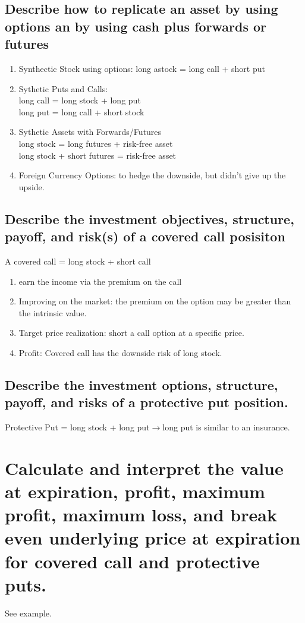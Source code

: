 \documentclass{article}
\newcommand{\be}{\begin{enumerate}}
\newcommand{\ee}{\end{enumerate}}
\newcommand{\ra}{$\rightarrow$}
\begin{document}
\subsection{Describe how to replicate an asset by using options an by using
cash plus forwards or futures}
\be
    \item Synthectic Stock using options: long astock = long call + short put
    \item Sythetic Puts and Calls: 
        \\long call = long stock + long put
        \\long put = long call + short stock
    \item Sythetic Assets with Forwards/Futures
        \\long stock = long futures + risk-free asset
        \\long stock + short futures = risk-free asset
    \item Foreign Currency Options: to hedge the downside, but didn't give up the 
    upside.
\ee
\subsection{Describe the investment objectives, structure, payoff, and risk(s) of
a covered call posisiton}
A covered call = long stock + short call
\be
    \item earn the income via the premium on the call
    \item Improving on the market: the premium on the option may be greater than
    the intrinsic value.
    \item Target price realization: short a call option at a specific price.
    \item Profit: Covered call has the downside risk of long stock.
\ee
\subsection{Describe the investment options, structure, payoff, and risks of a
protective put position.}
Protective Put = long stock + long put\ra long put is similar to an insurance.

\section{Calculate and interpret the value at expiration, profit, maximum profit,
maximum loss, and break even underlying price at expiration for covered call and 
protective puts.}
See example.
\end{document}
